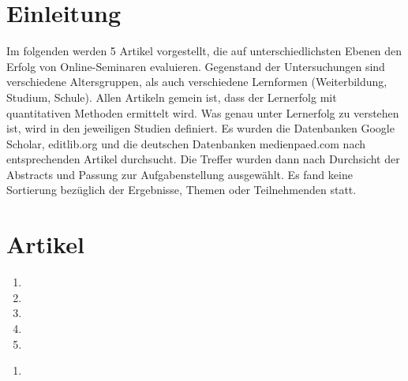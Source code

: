 \section{Einleitung}\label{einleitung}

Im folgenden werden 5 Artikel vorgestellt, die auf unterschiedlichsten
Ebenen den Erfolg von Online-Seminaren evaluieren. Gegenstand der
Untersuchungen sind verschiedene Altersgruppen, als auch verschiedene
Lernformen (Weiterbildung, Studium, Schule). Allen Artikeln gemein ist,
dass der Lernerfolg mit quantitativen Methoden ermittelt wird. Was genau
unter Lernerfolg zu verstehen ist, wird in den jeweiligen Studien
definiert. Es wurden die Datenbanken Google Scholar, editlib.org und die
deutschen Datenbanken medienpaed.com nach entsprechenden Artikel
durchsucht. Die Treffer wurden dann nach Durchsicht der Abstracts und
Passung zur Aufgabenstellung ausgewählt. Es fand keine Sortierung
bezüglich der Ergebnisse, Themen oder Teilnehmenden statt.

\section{Artikel}\label{artikel}

\begin{enumerate}
\def\labelenumi{\arabic{enumi}.}
\item
\item
\item
\item
\item
\end{enumerate}

\pagebreak

\begin{enumerate}
\def\labelenumi{\arabic{enumi}.}
\itemsep1pt\parskip0pt
\item
  \textbf{}
\end{enumerate}

